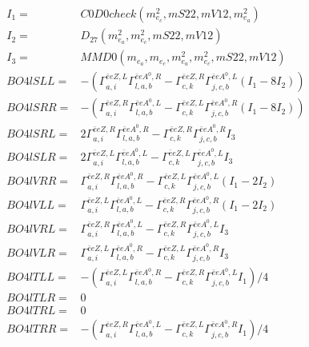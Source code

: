 \documentclass[A4,landscape]{article}
\begin{document}
\begin{align} 
I_1 = & C0D0check(m^2_{e_{{c}}}, mS22, mV12, m^2_{e_{{a}}}) \\ 
I_2 = & D_{27}(m^2_{e_{{a}}}, m^2_{e_{{c}}}, mS22, mV12) \\ 
I_3 = & MMD0(m_{e_{{a}}}, m_{e_{{c}}}, m^2_{e_{{a}}}, m^2_{e_{{c}}}, mS22, mV12) \\ 
  BO4lSLL= & -( \Gamma^{\bar{e}e Z ,L}_{a, i} \Gamma^{\bar{e}e A^0 ,R}_{l, a, b} - \Gamma^{\bar{e}e Z ,R} _{c, k} \Gamma^{\bar{e}e A^0 ,L}_{j, c, b} (I_1 - 8 I_2)) \\ 
  BO4lSRR= & -( \Gamma^{\bar{e}e Z ,R}_{a, i} \Gamma^{\bar{e}e A^0 ,L}_{l, a, b} - \Gamma^{\bar{e}e Z ,L} _{c, k} \Gamma^{\bar{e}e A^0 ,R}_{j, c, b} (I_1 - 8 I_2)) \\ 
  BO4lSRL= & 2  \Gamma^{\bar{e}e Z ,R}_{a, i} \Gamma^{\bar{e}e A^0 ,R}_{l, a, b} - \Gamma^{\bar{e}e Z ,R} _{c, k} \Gamma^{\bar{e}e A^0 ,R}_{j, c, b} I_3 \\ 
  BO4lSLR= & 2  \Gamma^{\bar{e}e Z ,L}_{a, i} \Gamma^{\bar{e}e A^0 ,L}_{l, a, b} - \Gamma^{\bar{e}e Z ,L} _{c, k} \Gamma^{\bar{e}e A^0 ,L}_{j, c, b} I_3 \\ 
  BO4lVRR= &  \Gamma^{\bar{e}e Z ,R}_{a, i} \Gamma^{\bar{e}e A^0 ,R}_{l, a, b} - \Gamma^{\bar{e}e Z ,L} _{c, k} \Gamma^{\bar{e}e A^0 ,L}_{j, c, b} (I_1 - 2 I_2) \\ 
  BO4lVLL= &  \Gamma^{\bar{e}e Z ,L}_{a, i} \Gamma^{\bar{e}e A^0 ,L}_{l, a, b} - \Gamma^{\bar{e}e Z ,R} _{c, k} \Gamma^{\bar{e}e A^0 ,R}_{j, c, b} (I_1 - 2 I_2) \\ 
  BO4lVRL= &  \Gamma^{\bar{e}e Z ,R}_{a, i} \Gamma^{\bar{e}e A^0 ,L}_{l, a, b} - \Gamma^{\bar{e}e Z ,R} _{c, k} \Gamma^{\bar{e}e A^0 ,L}_{j, c, b} I_3 \\ 
  BO4lVLR= &  \Gamma^{\bar{e}e Z ,L}_{a, i} \Gamma^{\bar{e}e A^0 ,R}_{l, a, b} - \Gamma^{\bar{e}e Z ,L} _{c, k} \Gamma^{\bar{e}e A^0 ,R}_{j, c, b} I_3 \\ 
  BO4lTLL= & -( \Gamma^{\bar{e}e Z ,L}_{a, i} \Gamma^{\bar{e}e A^0 ,R}_{l, a, b} - \Gamma^{\bar{e}e Z ,R} _{c, k} \Gamma^{\bar{e}e A^0 ,L}_{j, c, b} I_1)/4 \\ 
  BO4lTLR= & 0 \\ 
  BO4lTRL= & 0 \\ 
  BO4lTRR= & -( \Gamma^{\bar{e}e Z ,R}_{a, i} \Gamma^{\bar{e}e A^0 ,L}_{l, a, b} - \Gamma^{\bar{e}e Z ,L} _{c, k} \Gamma^{\bar{e}e A^0 ,R}_{j, c, b} I_1)/4 \\ 
\end{align} 
\end{document}
